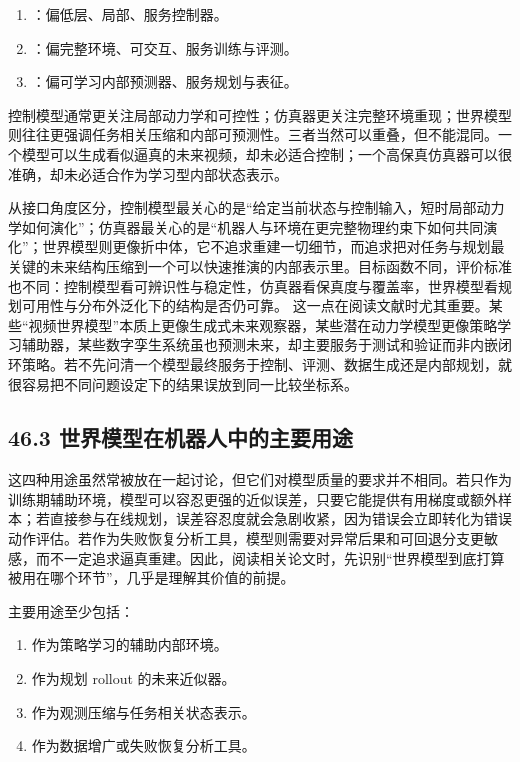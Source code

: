 \begin{enumerate}
\item \texttt{}：偏低层、局部、服务控制器。
\item \texttt{}：偏完整环境、可交互、服务训练与评测。
\item \texttt{}：偏可学习内部预测器、服务规划与表征。
\end{enumerate}

控制模型通常更关注局部动力学和可控性；仿真器更关注完整环境重现；世界模型则往往更强调任务相关压缩和内部可预测性。三者当然可以重叠，但不能混同。一个模型可以生成看似逼真的未来视频，却未必适合控制；一个高保真仿真器可以很准确，却未必适合作为学习型内部状态表示。

从接口角度区分，控制模型最关心的是“给定当前状态与控制输入，短时局部动力学如何演化”；仿真器最关心的是“机器人与环境在更完整物理约束下如何共同演化”；世界模型则更像折中体，它不追求重建一切细节，而追求把对任务与规划最关键的未来结构压缩到一个可以快速推演的内部表示里。目标函数不同，评价标准也不同：控制模型看可辨识性与稳定性，仿真器看保真度与覆盖率，世界模型看规划可用性与分布外泛化下的结构是否仍可靠。 这一点在阅读文献时尤其重要。某些“视频世界模型”本质上更像生成式未来观察器，某些潜在动力学模型更像策略学习辅助器，某些数字孪生系统虽也预测未来，却主要服务于测试和验证而非内嵌闭环策略。若不先问清一个模型最终服务于控制、评测、数据生成还是内部规划，就很容易把不同问题设定下的结果误放到同一比较坐标系。

\subsection*{46.3 世界模型在机器人中的主要用途}


这四种用途虽然常被放在一起讨论，但它们对模型质量的要求并不相同。若只作为训练期辅助环境，模型可以容忍更强的近似误差，只要它能提供有用梯度或额外样本；若直接参与在线规划，误差容忍度就会急剧收紧，因为错误会立即转化为错误动作评估。若作为失败恢复分析工具，模型则需要对异常后果和可回退分支更敏感，而不一定追求逼真重建。因此，阅读相关论文时，先识别“世界模型到底打算被用在哪个环节”，几乎是理解其价值的前提。

主要用途至少包括：

\begin{enumerate}
\item 作为策略学习的辅助内部环境。
\item 作为规划 rollout 的未来近似器。
\item 作为观测压缩与任务相关状态表示。
\item 作为数据增广或失败恢复分析工具。
\end{enumerate}

